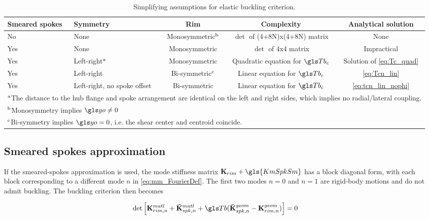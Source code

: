 \documentclass[\rootdir/thesis.tex]{subfiles}
\begin{document}
\begin{table}[h]
\caption{Simplifying assumptions for elastic buckling criterion.}
\label{tab:BucklingSolutions}
\begin{tabularx}{\textwidth}{p{1.2cm}Xccc}
\toprule
\centering Smeared spokes & \centering Symmetry & Rim & Complexity & Analytical solution\\
\midrule
\centering No  & \centering None & Monosymmetric$^{\rm b}$ & $\det$ of (4+8N)x(4+8N) matrix & None\\
\centering Yes & \centering None & Monosymmetric & $\det$ of 4x4 matrix & Impractical\\
\centering Yes & \centering Left-right$^{\rm a}$& Monosymmetric& Quadratic equation for $\Tb_c$ & Solution of \eqref{eq:Tc_quad}\\
\centering Yes & \centering Left-right& Bi-symmetric$^{\rm c}$ & Linear equation for $\Tb_c$ & \eqref{eq:Tcn_lin}\\
\centering Yes & \centering Left-right, no spoke offset & Bi-symmetric & Linear equation for $\Tb_c$ & \eqref{eq:tcn_lin_nophi}\\
\bottomrule
\multicolumn{5}{p{\textwidth}}{
$^{\rm a}$The distance to the hub flange and spoke arrangement are identical on the left and right sides, which implies no radial/lateral coupling.
}\\
\multicolumn{5}{p{\textwidth}}{
$^{\rm b}$Monosymmetry implies $\yo\neq 0$
}\\
\multicolumn{5}{p{\textwidth}}{
$^{\rm c}$Bi-symmetry implies $\yo=0$, i.e. the shear center and centroid coincide.
}\\
\bottomrule
\end{tabularx}
\end{table}

\subsection{Smeared spokes approximation}

If the smeared-spokes approximation is used, the mode stiffness matrix $\KmRim + \gls{KmSpkSm}$ has a block diagonal form, with each block corresponding to a different mode $n$ in \eqref{eq:mm_FourierDef}. The first two modes $n=0$ and $n=1$ are rigid-body motions and do not admit buckling. The buckling criterion then becomes

\begin{equation}
\label{eq:Tc_crit_smeared}
\det{\left[\matl{\mathbf{K}_{rim,n}} + \matl{\mathbf{\bar{K}}_{spk,n}} + \Tb(\geom{\mathbf{\bar{K}}_{spk,n}} - \geom{\mathbf{K}_{rim,n}})\right]} = 0
\end{equation}
\end{document}
